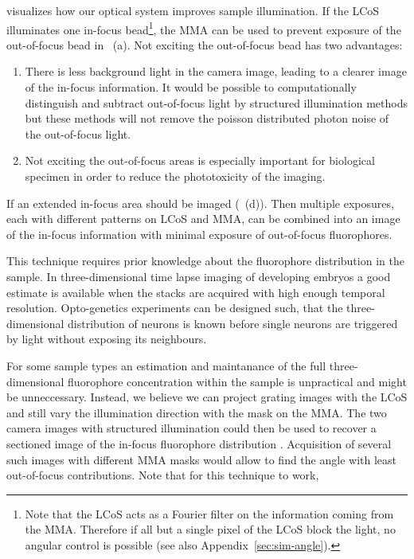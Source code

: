  visualizes how our optical system improves
sample illumination. If the LCoS illuminates one in-focus
bead\footnote{Note that the LCoS acts as a Fourier filter on the
  information coming from the MMA. Therefore if all but a single pixel
  of the LCoS block the light, no angular control is possible (see
  also Appendix~\ref{sec:sim-angle}).}, the MMA can be used to prevent
exposure of the out-of-focus bead in
~(a). Not exciting the out-of-focus bead has
two advantages:
\begin{enumerate}
\item There is less background light in the camera image, leading to a
  clearer image of the in-focus information. It would be possible to
  computationally distinguish and subtract out-of-focus light by
  structured illumination methods but these methods will not remove
  the poisson distributed photon noise of the out-of-focus light.
\item Not exciting the out-of-focus areas is especially important for
  biological specimen in order to reduce the phototoxicity of the
  imaging.
\end{enumerate}
If an extended in-focus area should be imaged
(~(d)). Then multiple exposures, each with
different patterns on LCoS and MMA, can be combined into an image of
the in-focus information with minimal exposure of out-of-focus
fluorophores.

This technique requires prior knowledge about the fluorophore
distribution in the sample. In three-dimensional time lapse imaging of
developing embryos a good estimate is available when the stacks are
acquired with high enough temporal resolution. Opto-genetics
experiments can be designed such, that the three-dimensional
distribution of neurons is known before single neurons are triggered
by light without exposing its neighbours.

For some sample types an estimation and maintanance of the full
three-dimensional fluorophore concentration within the sample is
unpractical and might be unneccessary. Instead, we believe we can
project grating images with the LCoS and still vary the illumination
direction with the mask on the MMA. The two camera images with
structured illumination could then be used to recover a sectioned
image of the in-focus fluorophore distribution
\citep{2008Lim,Bozinovic2008,2009Santos}. Acquisition of several such
images with different MMA masks would allow to find the angle with
least out-of-focus contributions. Note that for this technique to
work,

